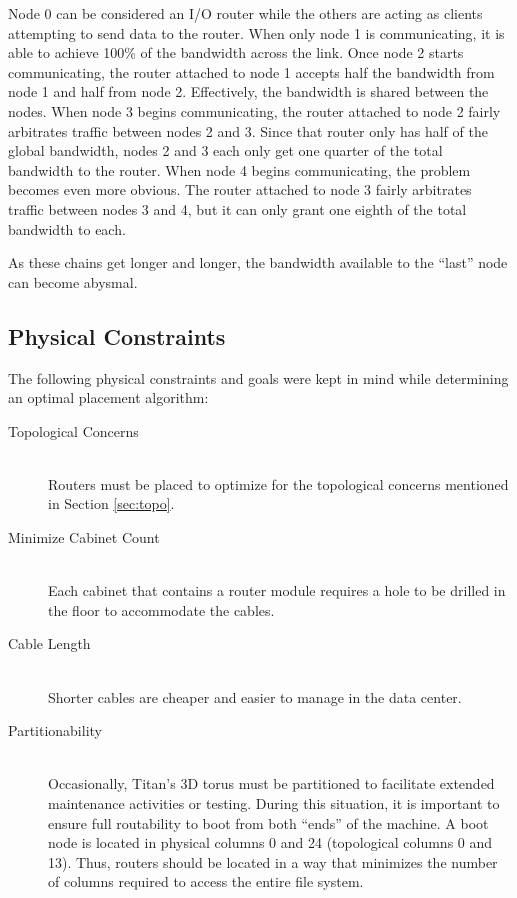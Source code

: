 Node 0 can be considered an I/O router while the others are acting as clients
attempting to send data to the router.  When only node 1 is communicating, it
is able to achieve 100\% of the bandwidth across the link.  Once node 2 starts
communicating, the router attached to node 1 accepts half the bandwidth from
node 1 and half from node 2.  Effectively, the bandwidth is shared between the
nodes.  When node 3 begins communicating, the router attached to node 2 fairly
arbitrates traffic between nodes 2 and 3.  Since that router only has half of
the global bandwidth, nodes 2 and 3 each only get one quarter of the total
bandwidth to the router.  When node 4 begins communicating, the problem becomes
even more obvious.  The router attached to node 3 fairly arbitrates traffic
between nodes 3 and 4, but it can only grant one eighth of the total bandwidth
to each.

As these chains get longer and longer, the bandwidth available to the ``last''
node can become abysmal.

\subsection{Physical Constraints}


The following physical constraints and goals were kept in mind while
determining an optimal placement algorithm:

\begin{description}
  \item[Topological Concerns] \hfill \\
    Routers must be placed to optimize for the topological concerns mentioned
    in Section \ref{sec:topo}.
  \item[Minimize Cabinet Count] \hfill \\
    Each cabinet that contains a router module requires a hole to be drilled in
    the floor to accommodate the cables.
  \item[Cable Length] \hfill \\
    Shorter cables are cheaper and easier to manage in the data center.
  \item[Partitionability] \hfill \\
    Occasionally, Titan's 3D torus must be partitioned to facilitate extended
    maintenance activities or testing.  During this situation, it is important to
    ensure full routability to boot from both ``ends'' of the machine.  A boot
    node is located in physical columns 0 and 24 (topological columns 0 and 13).
    Thus, routers should be located in a way that minimizes the number of
    columns required to access the entire file system.
\end{description}

